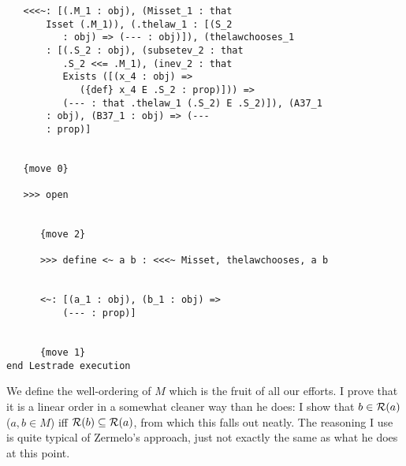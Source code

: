 \documentclass[12pt]{article}
\begin{document}
\begin{verbatim}
   <<<~: [(.M_1 : obj), (Misset_1 : that 
       Isset (.M_1)), (.thelaw_1 : [(S_2 
          : obj) => (--- : obj)]), (thelawchooses_1 
       : [(.S_2 : obj), (subsetev_2 : that 
          .S_2 <<= .M_1), (inev_2 : that 
          Exists ([(x_4 : obj) => 
             ({def} x_4 E .S_2 : prop)])) => 
          (--- : that .thelaw_1 (.S_2) E .S_2)]), (A37_1 
       : obj), (B37_1 : obj) => (--- 
       : prop)]


   {move 0}

   >>> open


      {move 2}

      >>> define <~ a b : <<<~ Misset, thelawchooses, a b


      <~: [(a_1 : obj), (b_1 : obj) => 
          (--- : prop)]


      {move 1}
end Lestrade execution
\end{verbatim}

We define the well-ordering of $M$ which is the fruit of all our efforts.  I prove that it is a linear order in a somewhat cleaner way than he does:
I show that $b \in {\cal R}(a)$ ($a,b \in M$) iff ${\cal R}(b) \subseteq {\cal R}(a)$, from which this falls out neatly.  The reasoning I use is quite typical of Zermelo's approach, just not exactly the same as what he does at this point.
\end{document}
